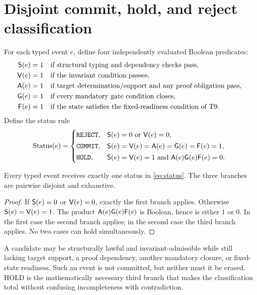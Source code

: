 \section{Disjoint commit, hold, and reject classification}

For each typed event $e$, define four independently evaluated Boolean predicates:
\begin{align}
\mathsf S(e)&=1 &&\text{if structural typing and dependency checks pass},\\
\mathsf V(e)&=1 &&\text{if the invariant condition passes},\\
\mathsf A(e)&=1 &&\text{if target determination/support and any proof obligation pass},\\
\mathsf G(e)&=1 &&\text{if every mandatory gate condition closes},\\
\mathsf F(e)&=1 &&\text{if the state satisfies the fixed-readiness condition of T9}.
\end{align}
Define the status rule
\begin{equation}
\operatorname{Status}(e)=
\begin{cases}
\texttt{REJECT}, & \Str(e)=0\ \text{or}\ \Val(e)=0,\\[2pt]
\texttt{COMMIT}, & \Str(e)=\Val(e)=\Adm(e)=\Gate(e)=\Fix(e)=1,\\[2pt]
\texttt{HOLD}, & \Str(e)=\Val(e)=1\ \text{and}\ \Adm(e)\Gate(e)\Fix(e)=0.
\end{cases}
\label{eq:status}
\end{equation}

\begin{theorem}
Every typed event receives exactly one status in \cref{eq:status}. The three branches are pairwise disjoint and exhaustive.
\end{theorem}

\begin{proof}
If $\mathsf S(e)=0$ or $\mathsf V(e)=0$, exactly the first branch applies. Otherwise $\mathsf S(e)=\mathsf V(e)=1$. The product $\mathsf A(e)\mathsf G(e)\mathsf F(e)$ is Boolean, hence is either $1$ or $0$. In the first case the second branch applies; in the second case the third branch applies. No two cases can hold simultaneously.
\end{proof}

\begin{remark}
A candidate may be structurally lawful and invariant-admissible while still lacking target support, a proof dependency, another mandatory closure, or fixed-state readiness. Such an event is not committed, but neither must it be erased. HOLD is the mathematically necessary third branch that makes the classification total without confusing incompleteness with contradiction.
\end{remark}
